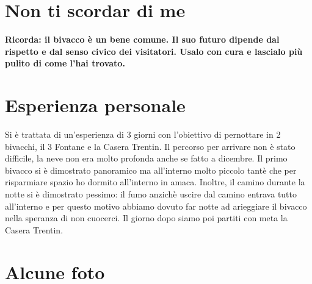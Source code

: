 \documentclass{article}
\begin{document}
\section{Non ti scordar di me}
\textbf{\textcolor{BurntOrange}{Ricorda: il bivacco è un bene comune. Il suo futuro dipende dal rispetto e dal senso civico dei visitatori. Usalo con cura e lascialo più pulito di come l'hai trovato.}}


\section{Esperienza personale}
Si è trattata di un'esperienza di 3 giorni con l'obiettivo di pernottare in 2 bivacchi, il 3 Fontane e la Casera Trentin. 
Il percorso per arrivare non è stato difficile, la neve non era molto profonda anche se fatto a dicembre.
Il primo bivacco si è dimostrato panoramico ma all'interno molto piccolo tantè che per risparmiare spazio ho dormito all'interno in amaca. Inoltre, il camino durante la notte si è dimostrato pessimo: il fumo anzichè uscire dal camino entrava tutto all'interno e per questo motivo abbiamo dovuto far notte ad arieggiare il bivacco nella speranza di non cuocerci. Il giorno dopo siamo poi partiti con meta la Casera Trentin.


\section{Alcune foto}

\end{document}
